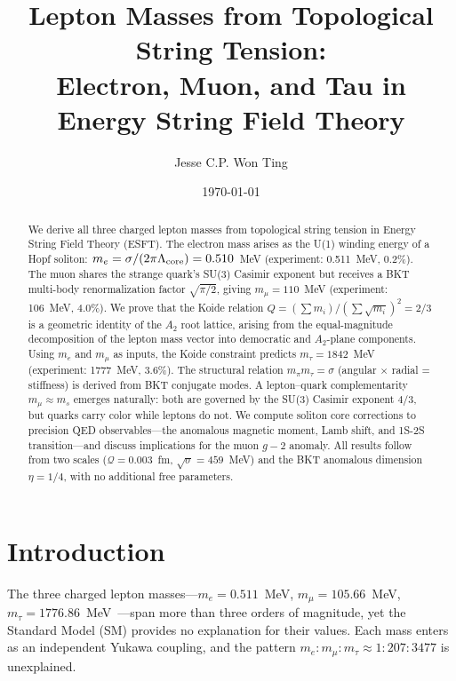﻿\documentclass[twocolumn,preprintnumbers,amsmath,amssymb]{revtex4-2}
\newcommand{\Qoppa}{\mathcal{Q}}
\begin{document}
\title{Lepton Masses from Topological String Tension:\\Electron, Muon, and Tau in Energy String Field Theory}

\author{Jesse C.P. Won Ting}

\date{\today}

\begin{abstract}
We derive all three charged lepton masses from topological string tension in Energy String Field Theory (ESFT). The electron mass arises as the U(1) winding energy of a Hopf soliton: $m_e = \sigma/(2\pi\Lambda_{\rm core}) = 0.510$~MeV (experiment: 0.511~MeV, 0.2\%). The muon shares the strange quark's SU(3) Casimir exponent but receives a BKT multi-body renormalization factor $\sqrt{\pi/2}$, giving $m_\mu = 110$~MeV (experiment: 106~MeV, 4.0\%). We prove that the Koide relation $Q = (\sum m_i)/(\sum\sqrt{m_i})^2 = 2/3$ is a geometric identity of the $A_2$ root lattice, arising from the equal-magnitude decomposition of the lepton mass vector into democratic and $A_2$-plane components. Using $m_e$ and $m_\mu$ as inputs, the Koide constraint predicts $m_\tau = 1842$~MeV (experiment: 1777~MeV, 3.6\%). The structural relation $m_\pi m_\tau = \sigma$ (angular $\times$ radial = stiffness) is derived from BKT conjugate modes. A lepton--quark complementarity $m_\mu \approx m_s$ emerges naturally: both are governed by the SU(3) Casimir exponent $4/3$, but quarks carry color while leptons do not. We compute soliton core corrections to precision QED observables---the anomalous magnetic moment, Lamb shift, and 1S-2S transition---and discuss implications for the muon $g{-}2$ anomaly. All results follow from two scales ($\Qoppa = 0.003$~fm, $\sqrt{\sigma} = 459$~MeV) and the BKT anomalous dimension $\eta = 1/4$, with no additional free parameters.
\end{abstract}

\maketitle

\section{Introduction}

The three charged lepton masses---$m_e = 0.511$~MeV, $m_\mu = 105.66$~MeV, $m_\tau = 1776.86$~MeV~\cite{PDG2024}---span more than three orders of magnitude, yet the Standard Model (SM) provides no explanation for their values. Each mass enters as an independent Yukawa coupling, and the pattern $m_e : m_\mu : m_\tau \approx 1 : 207 : 3477$ is unexplained.
\end{document}
